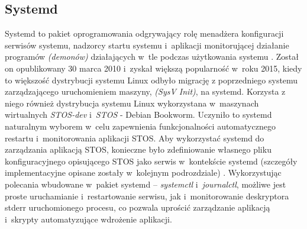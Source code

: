 \subsection{Systemd}
Systemd to pakiet oprogramowania odgrywający rolę menadżera konfiguracji serwisów systemu, nadzorcy startu systemu i~aplikacji monitorującej działanie programów \textit{(demonów)} działających w~tle podczas użytkowania systemu \cite{systemd}. Został on opublikowany 30 marca 2010 i~zyskał większą popularność w~roku 2015, kiedy to większość dystrybucji systemu Linux odbyło migrację z poprzedniego systemu zarządzającego uruchomieniem maszyny, \textit{(SysV Init)}, na systemd. Korzysta z niego również dystrybucja systemu Linux wykorzystana w~maszynach wirtualnych \textit{STOS-dev} i~\textit{STOS} - Debian Bookworm. Uczyniło to systemd naturalnym wyborem w~celu zapewnienia funkcjonalności automatycznego restartu i~monitorowania aplikacji STOS. 
\newline \noindent Aby wykorzystać systemd do zarządzania aplikacją STOS, konieczne było zdefiniowanie własnego pliku konfiguracyjnego opisującego STOS jako serwis w~kontekście systemd (szczegóły implementacyjne opisane zostały w~kolejnym podrozdziale) \cite{systemd-service}. Wykorzystując polecania wbudowane w~pakiet systemd -- \textit{systemctl} i~\textit{journalctl}, możliwe jest proste uruchamianie i~restartowanie serwisu, jak i~monitorowanie deskryptora stderr uruchomionego procesu, co pozwala uprościć zarządzanie aplikacją i~skrypty automatyzujące wdrożenie aplikacji.
